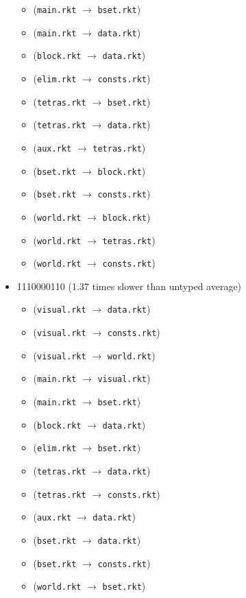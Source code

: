 \documentclass{article}
\newcommand{\mono}[1]{\texttt{#1}}
\begin{document}
\begin{itemize}
\begin{itemize}
  \item (\mono{main.rkt} $\rightarrow$ \mono{bset.rkt})
  \item (\mono{main.rkt} $\rightarrow$ \mono{data.rkt})
  \item (\mono{block.rkt} $\rightarrow$ \mono{data.rkt})
  \item (\mono{elim.rkt} $\rightarrow$ \mono{consts.rkt})
  \item (\mono{tetras.rkt} $\rightarrow$ \mono{bset.rkt})
  \item (\mono{tetras.rkt} $\rightarrow$ \mono{data.rkt})
  \item (\mono{aux.rkt} $\rightarrow$ \mono{tetras.rkt})
  \item (\mono{bset.rkt} $\rightarrow$ \mono{block.rkt})
  \item (\mono{bset.rkt} $\rightarrow$ \mono{consts.rkt})
  \item (\mono{world.rkt} $\rightarrow$ \mono{block.rkt})
  \item (\mono{world.rkt} $\rightarrow$ \mono{tetras.rkt})
  \item (\mono{world.rkt} $\rightarrow$ \mono{consts.rkt})
  \end{itemize}
\item 1110000110 (1.37 times slower than untyped average)
  \begin{itemize}
  \item (\mono{visual.rkt} $\rightarrow$ \mono{data.rkt})
  \item (\mono{visual.rkt} $\rightarrow$ \mono{consts.rkt})
  \item (\mono{visual.rkt} $\rightarrow$ \mono{world.rkt})
  \item (\mono{main.rkt} $\rightarrow$ \mono{visual.rkt})
  \item (\mono{main.rkt} $\rightarrow$ \mono{bset.rkt})
  \item (\mono{block.rkt} $\rightarrow$ \mono{data.rkt})
  \item (\mono{elim.rkt} $\rightarrow$ \mono{bset.rkt})
  \item (\mono{tetras.rkt} $\rightarrow$ \mono{data.rkt})
  \item (\mono{tetras.rkt} $\rightarrow$ \mono{consts.rkt})
  \item (\mono{aux.rkt} $\rightarrow$ \mono{data.rkt})
  \item (\mono{bset.rkt} $\rightarrow$ \mono{data.rkt})
  \item (\mono{bset.rkt} $\rightarrow$ \mono{consts.rkt})
  \item (\mono{world.rkt} $\rightarrow$ \mono{bset.rkt})

\end{itemize}
\end{itemize}
\end{document}
